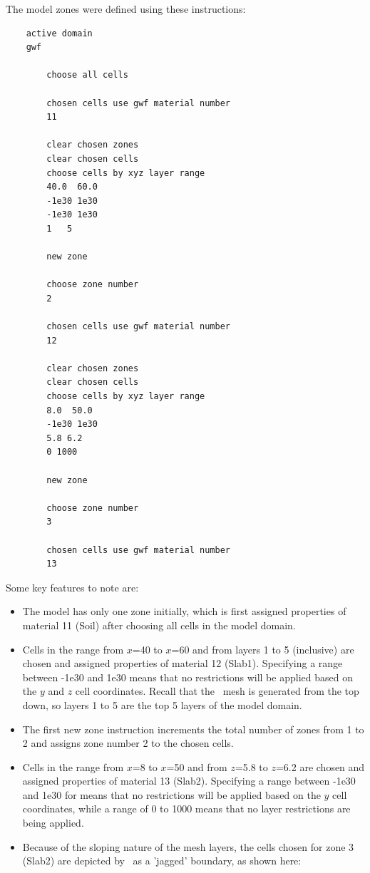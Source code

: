 {The model zones were defined using these instructions:
\begin{verbatim}
    active domain
    gwf

        choose all cells

        chosen cells use gwf material number
        11

        clear chosen zones
        clear chosen cells
        choose cells by xyz layer range
        40.0  60.0
        -1e30 1e30
        -1e30 1e30
        1   5

        new zone

        choose zone number
        2

        chosen cells use gwf material number
        12

        clear chosen zones
        clear chosen cells
        choose cells by xyz layer range
        8.0  50.0
        -1e30 1e30
        5.8 6.2
        0 1000

        new zone

        choose zone number
        3

        chosen cells use gwf material number
        13
\end{verbatim}


Some key features to note are:
\begin{itemize}
    \item The model has only one zone initially, which is first assigned properties of material 11 (Soil) after choosing all cells in the model domain.
    \item Cells in the range from $x$=40 to $x$=60 and from layers 1 to 5 (inclusive) are chosen and assigned properties of material 12 (Slab1).  Specifying a range between -1e30 and 1e30 means that no restrictions will be applied based on the $y$ and $z$ cell coordinates. Recall that the \mfus\ mesh is generated from the top down, so layers 1 to 5 are the top 5 layers of the model domain.
    \item The first {\sf new zone} instruction increments the total number of zones from 1 to 2 and assigns zone number 2 to the chosen cells.
    \item Cells in the range from $x$=8 to $x$=50 and from $z$=5.8 to $z$=6.2 are chosen and assigned properties of material 13 (Slab2).  Specifying a range between -1e30 and 1e30 for means that no restrictions will be applied based on the $y$ cell coordinates, while a range of 0 to 1000 means that no layer restrictions are being applied.
    \item Because of the sloping nature of the mesh layers, the cells chosen for zone 3 (Slab2) are depicted by \tecplot\ as a 'jagged' boundary, as shown here:


\end{itemize}}
